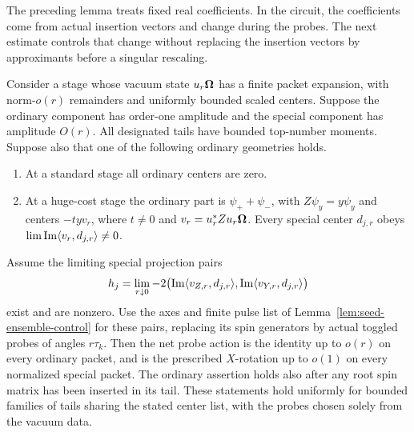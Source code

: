 The preceding lemma treats fixed real coefficients.  In the circuit,
the coefficients come from actual insertion vectors and change during
the probes.  The next estimate controls that change without replacing
the insertion vectors by approximants before a singular rescaling.

\begin{lemma}
\label{lem:seed-selective-accuracy}
Consider a stage whose vacuum state \(u_r\boldsymbol\Omega\) has a finite packet
expansion, with norm-\(o(r)\) remainders and uniformly bounded scaled
centers.  Suppose the ordinary component has order-one amplitude and
the special component has amplitude \(O(r)\).  All designated tails have
bounded top-number moments.  Suppose also that one of the following
ordinary geometries holds.
\begin{enumerate}
\item At a standard stage all ordinary centers are zero.
\item At a huge-cost stage the ordinary part is
\(\psi_++\psi_-\), with \(Z\psi_y=y\psi_y\) and centers
\(-tyv_r\), where \(t\neq0\) and \(v_r=u_r^*Zu_r\boldsymbol\Omega\).
Every special center \(d_{j,r}\) obeys
\(\lim\operatorname{Im}\langle v_r,d_{j,r}\rangle\neq0\).
\end{enumerate}
Assume the limiting special projection pairs
\[
 h_j=\lim_{r\downarrow0}-2
 \bigl(\operatorname{Im}\langle v_{Z,r},d_{j,r}\rangle,
       \operatorname{Im}\langle v_{Y,r},d_{j,r}\rangle\bigr)
\]
exist and are nonzero.  Use the axes and finite pulse list of
Lemma~\ref{lem:seed-ensemble-control} for these pairs, replacing its
spin generators by actual toggled probes of angles \(r\tau_k\).
Then the net probe action is the identity up to \(o(r)\) on every
ordinary packet, and is the prescribed \(X\)-rotation up to \(o(1)\)
on every normalized special packet.  The ordinary assertion holds also
after any root spin matrix has been inserted in its tail.  These
statements hold uniformly for bounded families of tails sharing the
stated center list, with the probes chosen solely from the vacuum data.
\end{lemma}

